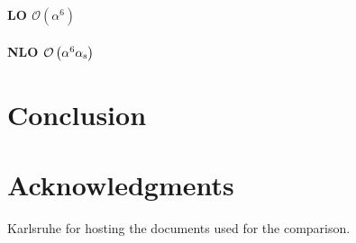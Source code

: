 \documentclass[a4paper,10pt]{report}
\begin{document}
\subsection{LO $\mathcal{O}\left(\alpha^6\right)$}


\subsection{NLO $\mathcal{O}\left(\alpha^6\alpha_{\rm s}\right)$}

\part{Conclusion}

\part{Acknowledgments}

Karlsruhe for hosting the documents used for the comparison.
\end{document}
